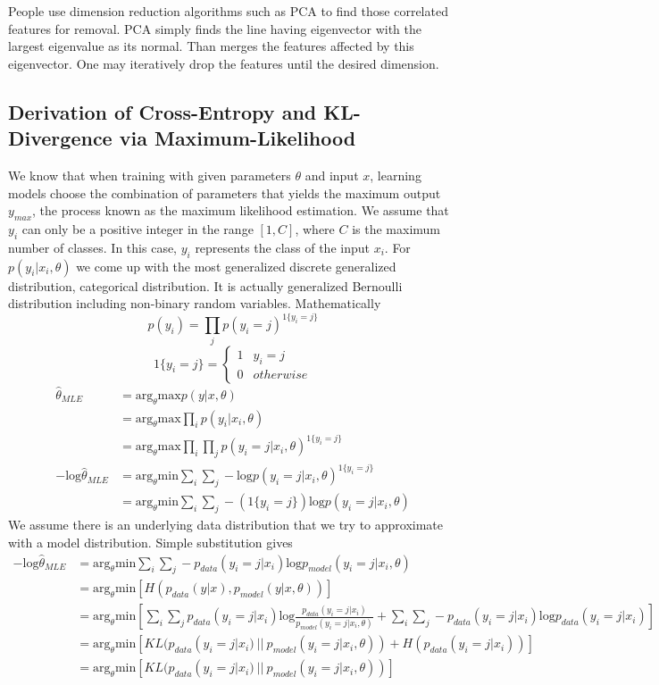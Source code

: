 \documentclass{article}
\numberwithin{equation}{subsection}
\begin{document}
People use dimension reduction algorithms such as PCA to find those correlated features for removal. PCA simply finds the line having eigenvector with the largest eigenvalue as its normal. Than merges the features affected by this eigenvector. One may iteratively drop the features until the desired dimension.
\subsection{Derivation of Cross-Entropy and KL-Divergence via Maximum-Likelihood}
We know that when training with given parameters $\theta$ and input $x$, learning models choose the combination of parameters that yields the maximum output $y_{max}$, the process known as the maximum likelihood estimation. We assume that $y_i$ can only be a positive integer in the range $[1,C]$, where $C$ is the maximum number of classes. In this case, $y_i$ represents the class of the input $x_i$.
For $p(y_i|x_i,\theta)$ we come up with the most generalized discrete generalized distribution, categorical distribution. It is actually generalized Bernoulli distribution including non-binary random variables. Mathematically
\begin{equation}
    p(y_i) = \prod_j p(y_i=j)^{1\{y_i=j\}}
\end{equation}
\begin{equation}
1\{y_i=j\} = \begin{cases}
    1 & y_i=j\\
    0 & otherwise
    \end{cases}
\end{equation}
\begin{align}
    \hat{\theta}_{MLE} &= \text{arg}_\theta \text{max}p(y|x,\theta)\\
     &= \text{arg}_\theta \text{max} \prod_i p(y_i|x_i,\theta)\\
     &= \text{arg}_\theta \text{max} \prod_i \prod_j p(y_i=j|x_i,\theta)^{1\{y_i=j\}}\\
     -\text{log}\hat{\theta}_{MLE} &= \text{arg}_\theta \text{min} \sum_i \sum_j -\text{log}p(y_i=j|x_i,\theta)^{1\{y_i=j\}}\\
     &= \text{arg}_\theta \text{min} \sum_i \sum_j -(1\{y_i=j\})\text{log}p(y_i=j|x_i,\theta)
\end{align} 
We assume there is an underlying data distribution that we try to approximate with a model distribution. Simple substitution gives 
\begin{align}
    -\text{log}\hat{\theta}_{MLE} &= \text{arg}_\theta \text{min} \sum_i \sum_j -p_{data}(y_i=j|x_i)\text{log}p_{model}(y_i=j|x_i,\theta)\\
    &= \text{arg}_\theta \text{min} [H(p_{data}(y|x),p_{model}(y|x,\theta))]\\
    &= \text{arg}_\theta \text{min} [\sum_i \sum_j p_{data}(y_i=j|x_i)\text{log}\frac{p_{data}(y_i=j|x_i)}{p_{model}(y_i=j|x_i,\theta)} + \sum_i \sum_j -p_{data}(y_i=j|x_i)\text{log}p_{data}(y_i=j|x_i)]\\
    &= \text{arg}_\theta \text{min}[KL(p_{data}(y_i=j|x_i)\ ||\ p_{model}(y_i=j|x_i,\theta)) + H(p_{data}(y_i=j|x_i))]\\
    &= \text{arg}_\theta \text{min}[KL(p_{data}(y_i=j|x_i)\ ||\ p_{model}(y_i=j|x_i,\theta))]
\end{align}
\end{document}
